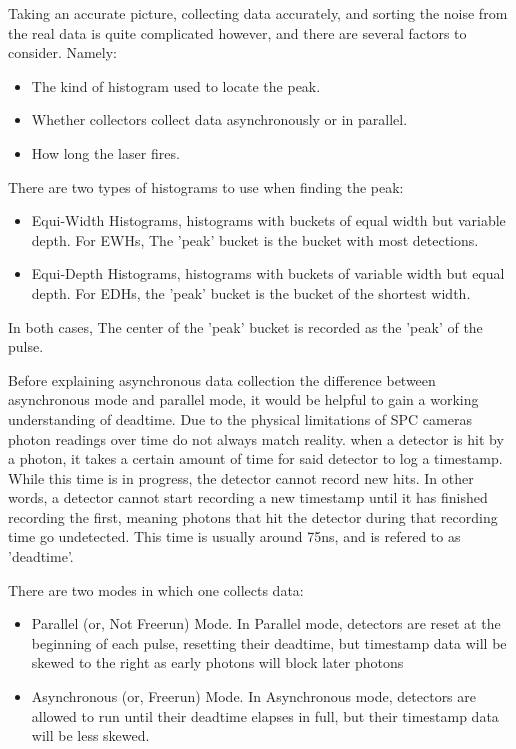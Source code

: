 \documentclass{article}
\begin{document}
Taking an accurate picture, collecting data accurately, and sorting the noise from the real data is quite complicated however, and there are several factors to consider. Namely:
\begin{itemize}
\item The kind of histogram used to locate the peak.
\item Whether collectors collect data asynchronously or in parallel.
\item How long the laser fires.
\end{itemize}

There are two types of histograms to use when finding the peak: \cite{sadekar}
\begin{itemize}
\item Equi-Width Histograms, histograms with buckets of equal width but variable depth. For EWHs, The 'peak' bucket is the bucket with most detections.
\item Equi-Depth Histograms, histograms with buckets of variable width but equal depth. For EDHs, the 'peak' bucket is the bucket of the shortest width.
\end{itemize}
In both cases, The center of the 'peak' bucket is recorded as the 'peak' of the pulse.

Before explaining asynchronous data collection the difference between asynchronous mode and parallel mode, it would be helpful to gain a working understanding of deadtime.
Due to the physical limitations of SPC cameras photon readings over time do not always match reality. when a detector is hit by a photon, it takes a certain amount of time for said detector to log a timestamp. While this time is in progress, the detector cannot record new hits. In other words, a detector cannot start recording a new timestamp until it has finished recording the first, meaning photons that hit the detector during that recording time go undetected. This time is usually around 75ns, and is refered to as 'deadtime'. \cite{sadekar}

There are two modes in which one collects data: \cite{sadekar}
\begin{itemize}
\item Parallel (or, Not Freerun) Mode. In Parallel mode, detectors are reset at the beginning of each pulse, resetting their deadtime, but timestamp data will be skewed to the right as early photons will block later photons
\item Asynchronous (or, Freerun) Mode. In Asynchronous mode, detectors are allowed to run until their deadtime elapses in full, but their timestamp data will be less skewed.
\end{itemize}
\end{document}
